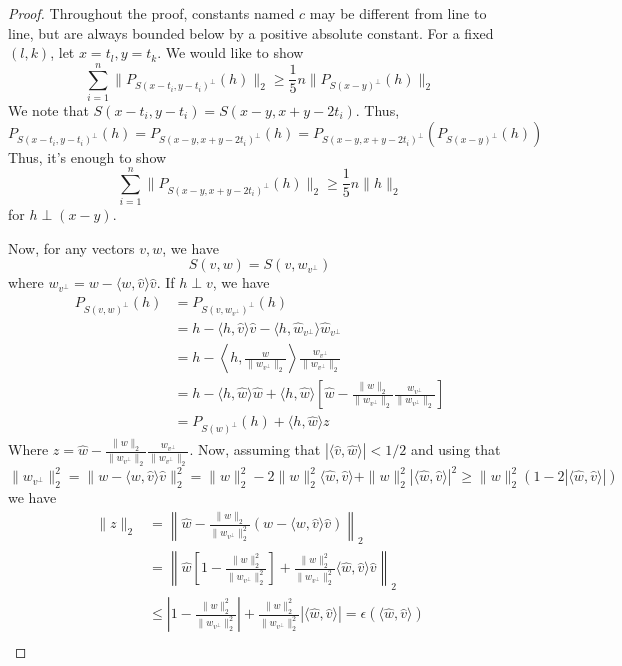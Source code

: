 \begin{proof}
Throughout the proof, constants named $c$ may be different from line to line, but are always bounded below by a positive absolute constant. For a fixed $(l,k)$, let $x = t_l, y = t_k$. We would like to show
\[
\sum_{i=1}^n \| P_{S(x-t_i, y-t_i)^\perp}(h) \|_2 \geq \frac{1}{5}n\|P_{S(x-y)^\perp}(h)\|_2
\]
We note that $S(x-t_i,y-t_i) = S(x-y, x+y -2t_i)$. Thus,
\[
P_{S(x-t_i, y-t_i)^\perp}(h) = P_{S(x-y, x+y-2t_i)^\perp}(h) = P_{S(x-y, x+y-2t_i)^\perp}(P_{S(x-y)^\perp}(h))
\]
Thus, it's enough to show
\[
\sum_{i=1}^n \| P_{S(x-y, x+y-2t_i)^\perp}(h) \|_2 \geq \frac{1}{5} n\|h\|_2
\]
for $h \perp (x-y)$. 

Now, for any vectors $v,w$, we have
\[
S(v,w) = S(v, w_{v^\perp})
\]
where $w_{v^\perp} = w - \langle w,\hat{v}\rangle \hat{v}$. If $h \perp v$, we have
\begin{align*}
P_{ S(v,w)^\perp}(h) &= P_{S(v, w_{v^\perp})^\perp}(h)\\
& = h - \langle h,\hat{v}\rangle \hat{v} - \langle h, \hat{w}_{v^\perp} \rangle \hat{w}_{v^\perp}\\
&= h - \left\langle h, \frac{w}{\|w_{v^\perp}\|_2} \right\rangle \frac{w_{v^\perp}}{\|w_{v^\perp}\|_2}\\
& = h - \langle h, \hat{w} \rangle \hat{w} + \langle h, \hat{w} \rangle \left[ \hat{w} - \frac{\|w\|_2}{\| w_{v^\perp} \|_2} \frac{w_{v^\perp}}{\|w_{v^\perp}\|_2} \right]\\
& = P_{S(w)^\perp}(h) + \langle h, \hat{w} \rangle z
\end{align*}
Where $z = \hat{w} - \frac{\|w\|_2}{\| w_{v^\perp} \|_2} \frac{w_{v^\perp}}{\|w_{v^\perp}\|_2}$. Now, assuming that $|\langle \hat{v} ,\hat{w} \rangle | < 1/2$ and using that
\[
\|w_{v^\perp}\|_2^2 = \|w - \langle w, \hat{v} \rangle \hat{v} \|_2^2 = \|w\|_2^2 - 2\|w\|_2^2 \langle \hat{w}, \hat{v} \rangle + \|w\|_2^2 |\langle \hat{w},\hat{v} \rangle|^2 \geq \|w\|_2^2(1 - 2 |\langle \hat{w}, \hat{v}\rangle|)
\]
we have
\begin{align*}
\|z\|_2 &= \left\| \hat{w} - \frac{\|w\|_2}{\|w_{v^\perp}\|_2^2} \left( w - \langle w, \hat{v} \rangle \hat{v}  \right) \right\|_2\\
&= \left\| \hat{w}\left[ 1 - \frac{\|w\|_2^2}{\|w_{v^\perp}\|_2^2}\right] + \frac{\|w\|_2^2}{\|w_{v^\perp}\|_2^2}\langle \hat{w}, \hat{v} \rangle \hat{v}  \right\|_2\\
& \leq \left | 1 - \frac{\|w\|_2^2}{\|w_{v^\perp}\|_2^2} \right | + \frac{\|w\|_2^2}{\|w_{v^\perp}\|_2^2} |\langle \hat{w}, \hat{v} \rangle | = \epsilon( \langle \hat{w},\hat{v}\rangle )\\

\end{align*}
\end{proof}
